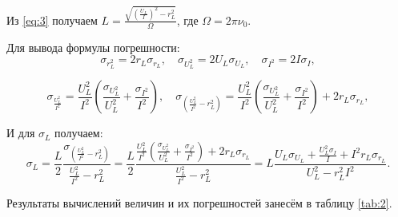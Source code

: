 \documentclass[a4paper,12pt]{article} %
\begin{document}
Из \eqref{eq:3} получаем $ \displaystyle L = \frac{{\sqrt {{{\left( {\frac{{{U_L}}}{I}} \right)}^2} - r_L^2} }}{\Omega } $, где $ \Omega = 2 \pi \nu_0 $.

Для вывода формулы погрешности:
\begin{equation*}
{\sigma _{r_L^2}} = 2{r_L}{\sigma _{{r_L}}}, \quad {\sigma _{U_L^2}} = 2{U_L}{\sigma _{{U_L}}}, \quad {\sigma _{{I^2}}} = 2I{\sigma _I},
\end{equation*}

\begin{equation*}
{\sigma _{\frac{{U_L^2}}{{{I^2}}}}} = \frac{{U_L^2}}{{{I^2}}}\left( {\frac{{{\sigma _{U_L^2}}}}{{U_L^2}} + \frac{{{\sigma _{{I^2}}}}}{{{I^2}}}} \right), \quad {\sigma _{\left( {\frac{{U_L^2}}{{{I^2}}} - r_L^2} \right)}} = \frac{{U_L^2}}{{{I^2}}}\left( {\frac{{{\sigma _{U_L^2}}}}{{U_L^2}} + \frac{{{\sigma _{{I^2}}}}}{{{I^2}}}} \right) + 2{r_L}{\sigma _{{r_L}}},
\end{equation*}

И для $ \sigma_L $ получаем:
\begin{equation}\label{eq:12}
{\sigma _L} = \frac{L}{2}\frac{{{\sigma _{\left( {\frac{{U_L^2}}{{{I^2}}} - r_L^2} \right)}}}}{{\frac{{U_L^2}}{{{I^2}}} - r_L^2}} = \frac{L}{2}\frac{{\frac{{U_L^2}}{{{I^2}}}\left( {\frac{{{\sigma _{U_L^2}}}}{{U_L^2}} + \frac{{{\sigma _{{I^2}}}}}{{{I^2}}}} \right) + 2{r_L}{\sigma _{{r_L}}}}}{{\frac{{U_L^2}}{{{I^2}}} - r_L^2}} = L\frac{{{U_L}{\sigma _{{U_L}}} + \frac{{U_L^2{\sigma _I}}}{I} + {I^2}{r_L}{\sigma _{{r_L}}}}}{{U_L^2 - r_L^2{I^2}}}.
\end{equation}

Результаты вычислений величин и их погрешностей занесём в таблицу \ref{tab:2}.
\end{document}
